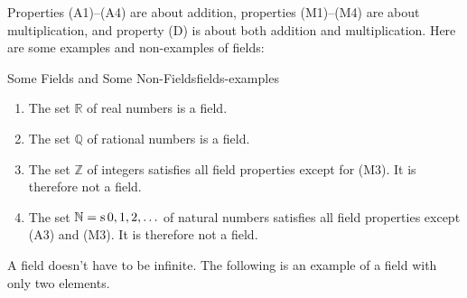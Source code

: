 Properties (A1)--(A4) are about addition, properties (M1)--(M4) are
about multiplication, and property (D) is about both addition and
multiplication. Here are some examples and non-examples of fields:

\begin{example}{Some Fields and Some Non-Fields}{fields-examples}
  \begin{enumialphparenastyle}
    \begin{enumerate}
    \item The set $\mathbb{R}$ of real numbers is a field.
    \item The set $\mathbb{Q}$ of rational numbers is a field.
    \item The set $\mathbb{Z}$ of integers satisfies all field
      properties except for (M3). It is therefore not a field.
    \item The set $\mathbb{N}=\mathop{\textrm{s}}\nolimits{0,1,2,\ldots}$ of natural numbers
      satisfies all field properties except (A3) and (M3). It is
      therefore not a field.
    \end{enumerate}
  \end{enumialphparenastyle}
\end{example}

A field doesn't have to be infinite. The following is an example of a
field with only two elements.

